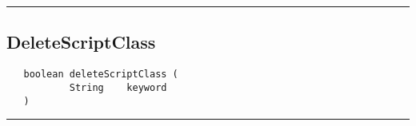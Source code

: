 \rule{15cm}{2pt}
\subsection{DeleteScriptClass}
\label{Api:DeleteScriptClass}
\begin{verbatim}
   boolean deleteScriptClass (
           String    keyword
   )
\end{verbatim}



\rule{15cm}{2pt}
